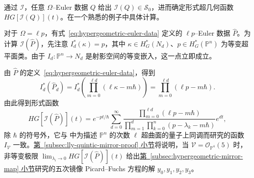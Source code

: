 通过 $\mathcal I$，任意 $\Omega$--Euler 数据 $Q$ 给出 $\mathcal I(Q)\in\mathcal S_0$，进而确定形式超几何函数 $HG[\mathcal I(Q)](t)$。在一个熟悉的例子中具体计算。
\begin{example}\label{ex:hypergeometric-euler-data-function}
对于 $\Omega=\ell p$，有式~\eqref{eq:hypergeometric-euler-data} 定义的 $\ell p$--Euler 数据 $\widehat P$。为计算 $\mathcal I(\widehat P)$，先注意 $I_d^*(\kappa)=p$，其中 $\kappa\in H_G^*(N_d)$、$p\in H_G^*(\mathbb P^n)$ 为等变超平面类。由于 $I_d:\mathbb P^n\to N_d$ 是射影空间的等变嵌入，这一点立即成立。

由 $\widehat P$ 的定义~\eqref{eq:hypergeometric-euler-data}，得到
\[
I_d^*(\widehat P_d)=I_d^*\left(\prod_{m=0}^{\ell d}(\ell\kappa-m\hbar)\right)
=\prod_{m=0}^{\ell d}(\ell p-m\hbar).
\]
由此得到形式函数
\begin{equation}\label{eq:hypergeometric-euler-data-function}
HG[\mathcal I(\widehat P)](t)
=e^{-pt/\hbar}\sum_{d=0}^{\infty}
\frac{\prod_{m=0}^{\ell d}(\ell p-m\hbar)}
{\prod_{m=1}^d\prod_{k=0}^n(p-\lambda_k-m\hbar)}e^{dt},
\end{equation}
除 $\hbar$ 的符号外，它与  中为描述 $\mathbb P^n$ 的次数 $\ell$ 超曲面的量子上同调而研究的函数 $I_{\mathcal V}$ 一致。\hyperref[subsec:lly-quintic-mirror-proof]{第~\ref*{subsec:lly-quintic-mirror-proof} 小节}将说明，当 $\mathcal V=\mathcal O_{\mathbb P^4}(5)$ 时，非等变极限 $\lim_{\lambda_i\to0}HG[\mathcal I(\widehat P)](t)$ 给出\hyperref[subsec:hypergeometric-mirror-map]{第~\ref*{subsec:hypergeometric-mirror-map} 小节}研究的五次镜像 Picard--Fuchs 方程的解 $y_0,y_1,y_2,y_3$。
\end{example}

